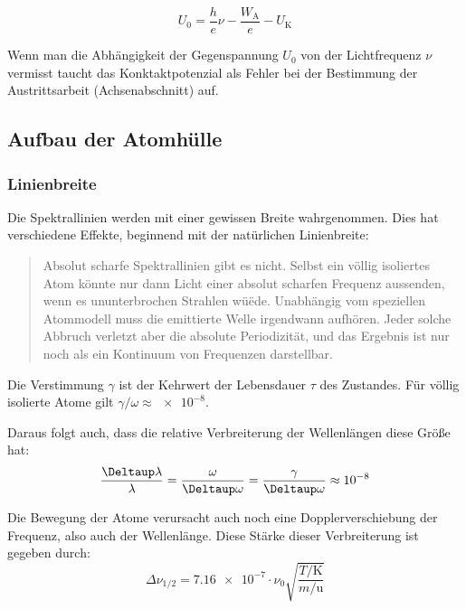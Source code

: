 \begin{equation}
    U_0 = \frac he\nu - \frac{W_\text{A}}e - U_\text{K}
    \label{eq:Energiebilanz}
\end{equation}

Wenn man die Abhängigkeit der Gegenspannung $U_0$ von der Lichtfrequenz $\nu$
vermisst taucht das Konktaktpotenzial als Fehler bei der Bestimmung der
Austrittsarbeit (Achsenabschnitt) auf.

\subsection{Aufbau der Atomhülle}

\subsubsection{Linienbreite}

Die Spektrallinien werden mit einer gewissen Breite wahrgenommen. Dies hat
verschiedene Effekte, beginnend mit der natürlichen Linienbreite:

\begin{quote}
    Absolut scharfe Spektrallinien gibt es nicht. Selbst ein völlig isoliertes
    Atom könnte nur dann Licht einer absolut scharfen Frequenz aussenden, wenn
    es ununterbrochen Strahlen wüëde. Unabhängig vom speziellen Atommodell muss
    die emittierte Welle irgendwann aufhören. Jeder solche Abbruch verletzt
    aber die absolute Periodizität, und das Ergebnis ist nur noch als ein
    Kontinuum von Frequenzen darstellbar.
    \parencite[Abschnitt~14.3.2]{meschede-gerthsen_24}
\end{quote}

Die Verstimmung $\gamma$ ist der Kehrwert der Lebensdauer $\tau$ des Zustandes.
Für völlig isolierte Atome gilt $\gamma / \omega \approx \num{e-8}$.
\parencite[Abschnitt~14.3.2]{meschede-gerthsen_24}

Daraus folgt auch, dass die relative Verbreiterung der Wellenlängen diese Größe
hat:
\[
    \frac{\Deltaup \lambda}{\lambda}
    = \frac{\omega}{\Deltaup \omega}
    = \frac{\gamma}{\Deltaup \omega}
    \approx \num{e-8}
\]

Die Bewegung der Atome verursacht auch noch eine Dopplerverschiebung der
Frequenz, also auch der Wellenlänge. Diese Stärke dieser Verbreiterung ist
gegeben durch: \parencite{chemgapedia/spektrallinien/dopplerverbreiterung}
\[
    \Delta \nu_{1/2} = \num{7.16e-7} \cdot \nu_0
    \sqrt{\frac{T/\si\kelvin}{m/\si\atomicmassunit}}
\]

